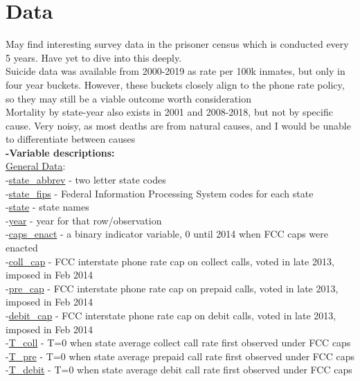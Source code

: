 \documentclass[10pt,a4paper]{article}
\begin{document}
\section{Data}
May find interesting survey data in the prisoner census which is conducted every 5 years. Have yet to dive into this deeply. \\

\noindent Suicide data was available from 2000-2019 as rate per 100k inmates, but only in four year buckets. However, these buckets closely align to the phone rate policy, so they may still be a viable outcome worth consideration \\

\noindent Mortality by state-year also exists in 2001 and 2008-2018, but not by specific cause. Very noisy, as most deaths are from natural causes, and I would be unable to differentiate between causes \\

\noindent \textbf{-Variable descriptions:} \\
\underline{General Data}: \\
-\underline{state\_abbrev} - two letter state codes \\
-\underline{state\_fips} - Federal Information Processing System codes for each state \\
-\underline{state} - state names \\
-\underline{year} - year for that row/observation \\
-\underline{caps\_enact} - a binary indicator variable, 0 until 2014 when FCC caps were enacted \\
-\underline{coll\_cap} - FCC interstate phone rate cap on collect calls, voted in late 2013, imposed in Feb 2014 \\
-\underline{pre\_cap} - FCC interstate phone rate cap on prepaid calls, voted in late 2013, imposed in Feb 2014 \\
-\underline{debit\_cap} - FCC interstate phone rate cap on debit calls, voted in late 2013, imposed in Feb 2014 \\
-\underline{T\_coll} - T=0 when state average collect call rate first observed under FCC caps \\
-\underline{T\_pre} - T=0 when state average prepaid call rate first observed under FCC caps \\
-\underline{T\_debit} - T=0 when state average debit call rate first observed under FCC caps \\
\\
\end{document}
